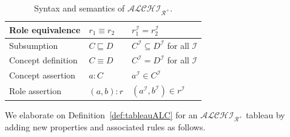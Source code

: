 \documentclass{article}
\begin{document}
\begin{center}
\begin{table}[H]
\begin{tabular}{|p{4cm} | p{2cm} | p{10cm}| }
    Role equivalence & $r_1\equiv r_2$ & $r_1^\mathcal{I} = r_2^\mathcal{I}$\\    \hline
    Subsumption & $C\sqsubseteq D$ & $C^\mathcal{I}\subseteq D^\mathcal{I}$ for all $\mathcal{I}$\\
    Concept definition & $C\equiv D$ & $C^\mathcal{I}= D^\mathcal{I}$ for all $\mathcal{I}$\\ \hline
    Concept assertion & $a:C$ & $a^\mathcal{I}\in C^\mathcal{I}$ \\
    Role assertion & $(a,b):r$ & $(a^\mathcal{I},b^\mathcal{I})\in r^\mathcal{I}$ \\ \hline
    \end{tabular}
    \caption{Syntax and semantics of $\mathcal{ALCHI_{R^+}}$.}
    \label{tab:alchir_interpretation}
\end{table}
\end{center} 
We elaborate on Definition~\ref{def:tableauALC} for an $\mathcal{ALCHI_{R^+}}$ tableau by adding new properties and associated rules as follows.
\end{document}
